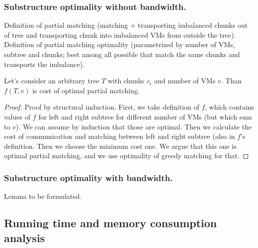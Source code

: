 \subsubsection{Substructure optimality without bandwidth.}

Definition of partial matching (matching + transporting imbalanced chunks out of tree and transporting chunk into imbalanced VMs from outside the tree). Definition of partial matching optimality (parametrized by number of VMs, subtree and chunks; best among all possible that match the same chunks and transports the imbalance).

\begin{lemma}

Let's consider an arbitrary tree $T$ with chunks $c_i$ and number of VMs $v$. Than $f(T, v)$ is cost of optimal partial matching.


\end{lemma}

\begin{proof}
Proof by structural induction. First, we take definition of $f$, which contains values of $f$ for left and right subtree for different number of VMs (but which sum to $v$). We can assume by induction that those are optimal. Then we calculate the cost of communication and matching between left and right subtree (also in $f$'s definition. Then we choose the minimum cost one. We argue that this one is optimal partial matching, and we use optimality of greedy matching for that.
\end{proof}

\subsubsection{Substructure optimality with bandwidth.}

Lemma to be formulated.

\subsection{Running time and memory consumption analysis}
